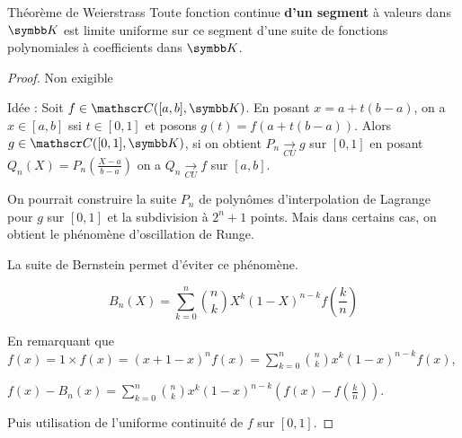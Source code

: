 \begin{theoreme}{Théorème de Weierstrass}{}
    Toute fonction continue \textbf{d'un segment} à valeurs dans $\K$ est limite uniforme sur ce segment 
    d'une suite de fonctions polynomiales à coefficients dans $\K$.
\end{theoreme}

\begin{proof}
    Non exigible 

    Idée : Soit $f \in \mathscr C([a, b], \K)$. En posant $x = a + t (b - a)$, on a 
    $x \in [a, b]$ ssi $t \in [0, 1]$ et posons $g(t) = f(a + t (b - a))$. 
    Alors $g \in \mathscr C([0, 1], \K)$, si on obtient $P_n \xrightarrow[CU]{} g$ sur $[0, 1]$
    en posant $Q_n(X) = P_n \left( \frac{X - a}{b - a} \right)$ on a $Q_n \xrightarrow[CU]{} f$ sur $[a, b]$.

    On pourrait construire la suite $P_n$ de polynômes d'interpolation de Lagrange pour 
    $g$ sur $[0, 1]$ et la subdivision à $2^{n} + 1$ points. Mais dans certains cas, on obtient 
    le phénomène d'oscillation de Runge.

    La suite de Bernstein permet d'éviter ce phénomène.

    $$B_n(X) = \sum_{k = 0}^{n} \binom{n}{k} X^k (1 - X)^{n - k} f\left( \frac k n \right)$$

    En remarquant que $\displaystyle f(x) = 1 \times f(x) = (x + 1 - x)^n f(x) = \sum_{k = 0}^{n} \binom{n}{k} x^k (1 - x)^{n - k} f(x)$,

    $\displaystyle f(x) - B_n(x) = \sum_{k = 0}^{n} \binom{n}{k} x^k (1 - x)^{n - k} \left( f(x) - f\left( \frac k n \right) \right)$.

    Puis utilisation de l'uniforme continuité de $f$ sur $[0, 1]$.
\end{proof}


